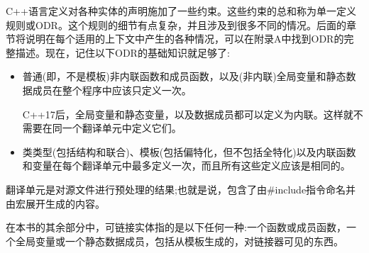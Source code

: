 C++语言定义对各种实体的声明施加了一些约束。这些约束的总和称为单一定义规则或ODR。这个规则的细节有点复杂，并且涉及到很多不同的情况。后面的章节将说明在每个适用的上下文中产生的各种情况，可以在附录A中找到ODR的完整描述。现在，记住以下ODR的基础知识就足够了:

\begin{itemize}
\item 
普通(即，不是模板)非内联函数和成员函数，以及(非内联)全局变量和静态数据成员在整个程序中应该只定义一次。

\begin{tcolorbox}[colback=webgreen!5!white,colframe=webgreen!75!black]
\hspace*{0.75cm}C++17后，全局变量和静态变量，以及数据成员都可以定义为内联。这样就不需要在同一个翻译单元中定义它们。
\end{tcolorbox}

\item 
类类型(包括结构和联合)、模板(包括偏特化，但不包括全特化)以及内联函数和变量在每个翻译单元中最多定义一次，而且所有这些定义应该是相同的。
\end{itemize}

翻译单元是对源文件进行预处理的结果;也就是说，包含了由\#include指令命名并由宏展开生成的内容。

在本书的其余部分中，可链接实体指的是以下任何一种:一个函数或成员函数，一个全局变量或一个静态数据成员，包括从模板生成的，对链接器可见的东西。




































